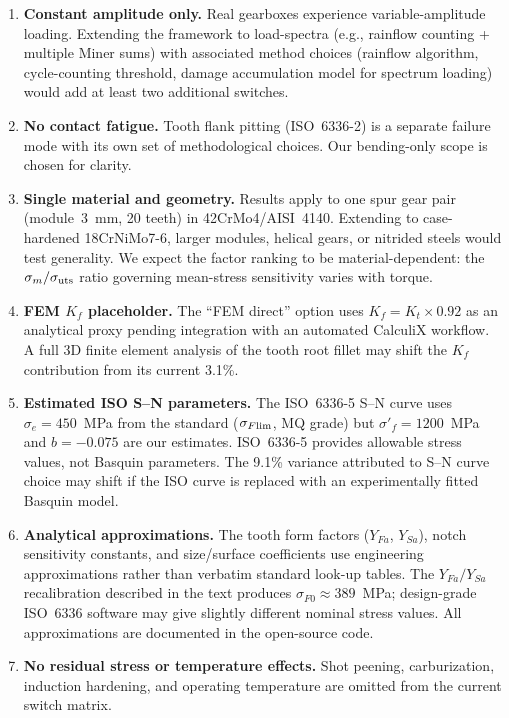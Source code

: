 \documentclass[12pt,a4paper]{article}
\begin{document}
\begin{enumerate}
  \item \textbf{Constant amplitude only.} Real gearboxes experience
        variable-amplitude loading. Extending the framework to
        load-spectra (e.g., rainflow counting + multiple Miner sums)
        with associated method choices (rainflow algorithm, cycle-counting
        threshold, damage accumulation model for spectrum loading) would
        add at least two additional switches.
  \item \textbf{No contact fatigue.} Tooth flank pitting (ISO~6336-2)
        is a separate failure mode with its own set of methodological
        choices. Our bending-only scope is chosen for clarity.
  \item \textbf{Single material and geometry.} Results apply to one
        spur gear pair (module~3~mm, 20 teeth) in 42CrMo4/AISI~4140.
        Extending to case-hardened 18CrNiMo7-6, larger modules, helical
        gears, or nitrided steels would test generality. We expect the
        factor ranking to be material-dependent: the $\sigma_m/\sigma_{\rm
        uts}$ ratio governing mean-stress sensitivity varies with torque.
  \item \textbf{FEM $K_f$ placeholder.} The ``FEM direct'' option uses
        $K_f = K_t \times 0.92$ as an analytical proxy pending integration
        with an automated CalculiX workflow. A full 3D finite element
        analysis of the tooth root fillet may shift the $K_f$ contribution
        from its current 3.1\%.
  \item \textbf{Estimated ISO S--N parameters.} The ISO~6336-5 S--N curve
        uses $\sigma_e = 450$~MPa from the standard ($\sigma_{F\rm lim}$,
        MQ grade) but $\sigma'_f = 1200$~MPa and $b = -0.075$ are our
        estimates. ISO~6336-5 provides allowable stress values, not Basquin
        parameters. The 9.1\% variance attributed to S--N curve choice may
        shift if the ISO curve is replaced with an experimentally fitted
        Basquin model.
  \item \textbf{Analytical approximations.} The tooth form factors
        ($Y_{Fa}$, $Y_{Sa}$), notch sensitivity constants, and
        size/surface coefficients use engineering approximations rather
        than verbatim standard look-up tables. The $Y_{Fa}/Y_{Sa}$
        recalibration described in the text produces $\sigma_{F0} \approx
        389$~MPa; design-grade ISO~6336 software may give slightly
        different nominal stress values. All approximations are documented
        in the open-source code.
  \item \textbf{No residual stress or temperature effects.} Shot peening,
        carburization, induction hardening, and operating temperature are
        omitted from the current switch matrix.
\end{enumerate}
\end{document}
